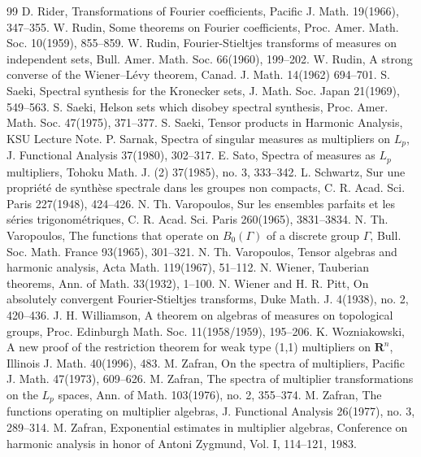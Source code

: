 \begin{thebibliography}{99}
 D. Rider, Transformations of Fourier coefficients, Pacific J. Math. 19(1966), 347--355.
 W. Rudin, Some theorems on Fourier coefficients, Proc. Amer. Math. Soc. 10(1959), 855--859.
 W. Rudin, Fourier-Stieltjes transforms of measures on independent sets, Bull. Amer. Math. Soc. 66(1960), 199--202.
 W. Rudin, A strong converse of the Wiener--Lévy theorem, Canad. J. Math. 14(1962) 694--701.
 S. Saeki, Spectral synthesis for the Kronecker sets, J. Math. Soc. Japan 21(1969), 549--563.
 S. Saeki, Helson sets which disobey spectral synthesis, Proc. Amer. Math. Soc. 47(1975), 371--377.
 S. Saeki, Tensor products in Harmonic Analysis, KSU Lecture Note.
 P. Sarnak, Spectra of singular measures as multipliers on $L_{p}$, J. Functional Analysis 37(1980), 302--317.
 E. Sato, Spectra of measures as $L_{p}$ multipliers, Tohoku Math. J. (2) 37(1985), no. 3, 333--342.
 L. Schwartz, Sur une propriété de synthèse spectrale dans les groupes non compacts, C. R. Acad. Sci. Paris 227(1948), 424--426.
 N. Th. Varopoulos, Sur les ensembles parfaits et les séries trigonométriques, C. R. Acad. Sci. Paris 260(1965), 3831--3834.
 N. Th. Varopoulos, The functions that operate on $B_{0}(\Gamma)$ of a discrete group $\Gamma$, Bull. Soc. Math. France 93(1965), 301--321.
 N. Th. Varopoulos, Tensor algebras and harmonic analysis, Acta Math. 119(1967), 51--112.
 N. Wiener, Tauberian theorems, Ann. of Math. 33(1932), 1--100.
 N. Wiener and H. R. Pitt, On absolutely convergent Fourier-Stieltjes transforms, Duke Math. J. 4(1938), no. 2, 420--436.
 J. H. Williamson, A theorem on algebras of measures on topological groups, Proc. Edinburgh Math. Soc. 11(1958/1959), 195--206.
 K. Wozniakowski, A new proof of the restriction theorem for weak type (1,1) multipliers on $\mathbf{R}^n$, Illinois J. Math. 40(1996), 483.
 M. Zafran, On the spectra of multipliers, Pacific J. Math. 47(1973), 609--626.
 M. Zafran, The spectra of multiplier transformations on the $L_{p}$ spaces, Ann. of Math. 103(1976), no. 2, 355--374.
 M. Zafran, The functions operating on multiplier algebras, J. Functional Analysis 26(1977), no. 3, 289--314.
 M. Zafran, Exponential estimates in multiplier algebras, Conference on harmonic analysis in honor of Antoni Zygmund, Vol. I, 114--121, 1983.
\end{thebibliography}